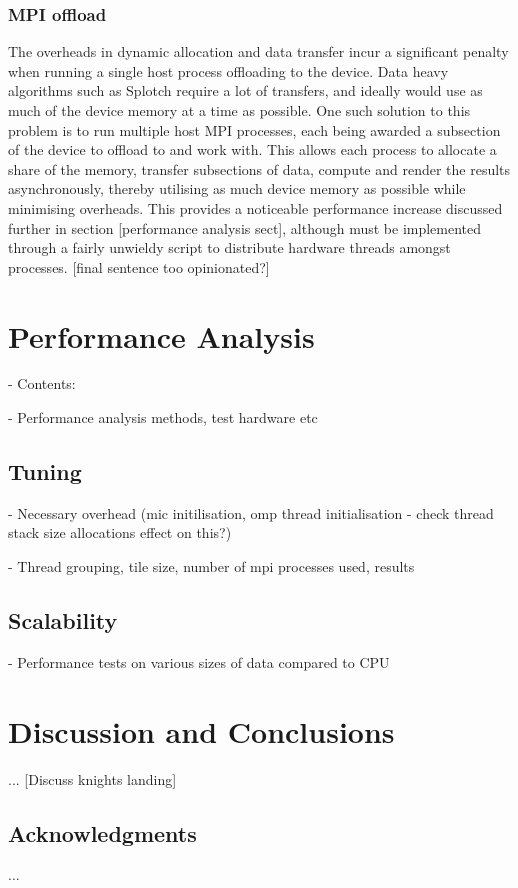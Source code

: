 \documentclass{easychair}
\begin{document}
\subsubsection{MPI offload}
\label{sect:mpioffload}
The overheads in dynamic allocation and data transfer incur a significant penalty when running a single host process 
offloading to the device. Data heavy algorithms such as Splotch require a lot of transfers, and ideally would use 
as much of the device memory at a time as possible. One such solution to this problem is to run multiple host MPI 
processes, each being awarded a subsection of the device to offload to and work with. This allows each process to 
allocate a share of the memory, transfer subsections of data, compute and render the results asynchronously, thereby 
utilising as much device memory as possible while minimising overheads. This provides a noticeable performance increase 
discussed further in section [performance analysis sect], although must be implemented through a fairly unwieldy script 
to distribute hardware threads amongst processes. [final sentence too opinionated?]


\section{Performance Analysis}
\label{sect:performance}

\noindent
- Contents:

\noindent
- Performance analysis methods, test hardware etc


\subsection{Tuning}
\label{sect:tuning}

\noindent
- Necessary overhead (mic initilisation, omp thread initialisation - check thread stack size allocations effect on this?)

\noindent
- Thread grouping, tile size, number of mpi processes used, results

\subsection{Scalability}
\label{sect:scalability}

\noindent
- Performance tests on various sizes of data compared to CPU

\section{Discussion and Conclusions}
\label{sect:conclusions}

...
[Discuss knights landing]

\subsection{Acknowledgments}
\label{sect:acks}

...

\end{document}
